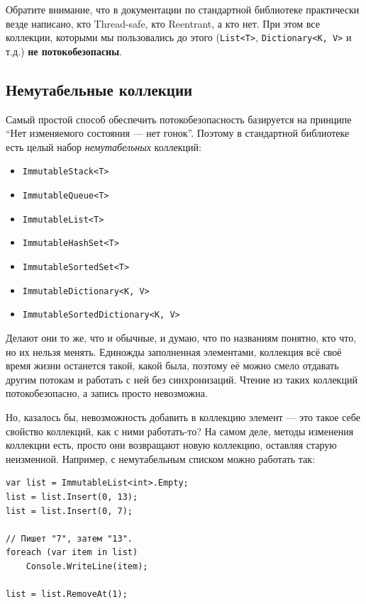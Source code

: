 \documentclass[a5paper]{article}
\begin{document}
Обратите внимание, что в документации по стандартной библиотеке практически везде написано, кто Thread-safe, кто Reentrant, а кто нет. При этом все коллекции, которыми мы пользовались до этого (\texttt{List<T>}, \texttt{Dictionary<K, V>} и т.д.) \textbf{не потокобезопасны}.

\subsection{Немутабельные коллекции}

Самый простой способ обеспечить потокобезопасность базируется на принципе ``Нет изменяемого состояния --- нет гонок''. Поэтому в стандартной библиотеке есть целый набор \textit{немутабельных} коллекций:

\begin{itemize}
    \item \texttt{ImmutableStack<T>}
    \item \texttt{ImmutableQueue<T>}
    \item \texttt{ImmutableList<T>}
    \item \texttt{ImmutableHashSet<T>}
    \item \texttt{ImmutableSortedSet<T>}
    \item \texttt{ImmutableDictionary<K, V>}
    \item \texttt{ImmutableSortedDictionary<K, V>}
\end{itemize}

Делают они то же, что и обычные, и думаю, что по названиям понятно, кто что, но их нельзя менять. Единожды заполненная элементами, коллекция всё своё время жизни останется такой, какой была, поэтому её можно смело отдавать другим потокам и работать с ней без синхронизаций. Чтение из таких коллекций потокобезопасно, а запись просто невозможна. 

Но, казалось бы, невозможность добавить в коллекцию элемент --- это такое себе свойство коллекций, как с ними работать-то? На самом деле, методы изменения коллекции есть, просто они возвращают новую коллекцию, оставляя старую неизменной. Например, с немутабельным списком можно работать так:

\begin{verbatim}
var list = ImmutableList<int>.Empty;
list = list.Insert(0, 13);
list = list.Insert(0, 7);

// Пишет "7", затем "13".
foreach (var item in list)
    Console.WriteLine(item);

list = list.RemoveAt(1);
\end{verbatim}
\end{document}
